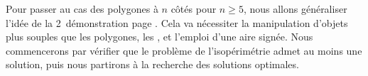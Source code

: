 Pour passer au cas des polygones à $n$ côtés pour $n \geq 5$, nous allons généraliser l'idée de la 2\ieme\ démonstration page \pageref{tri-topo-comp}. Cela va nécessiter la manipulation d'objets plus souples que les polygones, les \ncycles, et l'emploi d'une aire signée.
Nous commencerons par vérifier que le problème de l'isopérimétrie admet au moins une solution, puis nous partirons à la recherche des solutions optimales.
